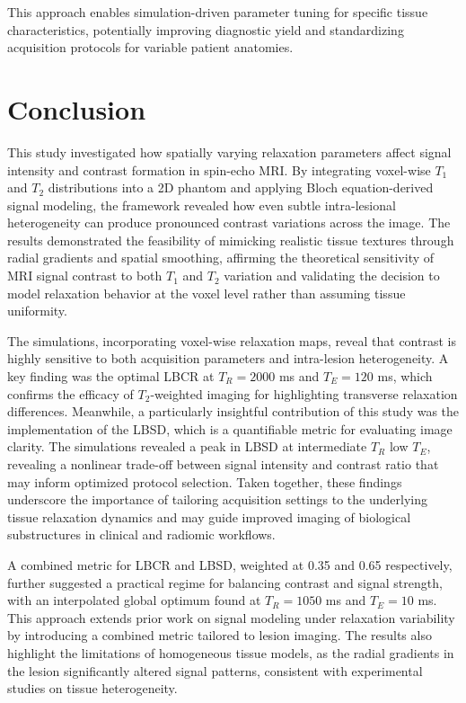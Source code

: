 \documentclass[10pt,a4paper,twoside]{article}
\begin{document}
This approach enables simulation-driven parameter tuning for specific tissue characteristics, potentially improving diagnostic yield and standardizing acquisition protocols for variable patient anatomies.


\section{Conclusion}

This study investigated how spatially varying relaxation parameters affect signal intensity and contrast formation in spin-echo MRI. By integrating voxel-wise $T_1$ and $T_2$ distributions into a 2D phantom and applying Bloch equation-derived signal modeling, the framework revealed how even subtle intra-lesional heterogeneity can produce pronounced contrast variations across the image. The results demonstrated the feasibility of mimicking realistic tissue textures through radial gradients and spatial smoothing, affirming the theoretical sensitivity of MRI signal contrast to both $T_1$ and $T_2$ variation and validating the decision to model relaxation behavior at the voxel level rather than assuming tissue uniformity.

The simulations, incorporating voxel-wise relaxation maps, reveal that contrast is highly sensitive to both acquisition parameters and intra-lesion heterogeneity. A key finding was the optimal LBCR at $T_R = 2000$ ms and $T_E = 120$ ms, which confirms the efficacy of $T_2$-weighted imaging for highlighting transverse relaxation differences. Meanwhile, a particularly insightful contribution of this study was the implementation of the LBSD, which is a quantifiable metric for evaluating image clarity. The simulations revealed a peak in LBSD at intermediate $T_R$ low $T_E$, revealing a nonlinear trade-off between signal intensity and contrast ratio that may inform optimized protocol selection. Taken together, these findings underscore the importance of tailoring acquisition settings to the underlying tissue relaxation dynamics and may guide improved imaging of biological substructures in clinical and radiomic workflows.

A combined metric for LBCR and LBSD, weighted at 0.35 and 0.65 respectively, further suggested a practical regime for balancing contrast and signal strength, with an interpolated global optimum found at $T_R = 1050$ ms and $T_E = 10$ ms. This approach extends prior work on signal modeling under relaxation variability by introducing a combined metric tailored to lesion imaging. The results also highlight the limitations of homogeneous tissue models, as the radial gradients in the lesion significantly altered signal patterns, consistent with experimental studies on tissue heterogeneity.
\end{document}
